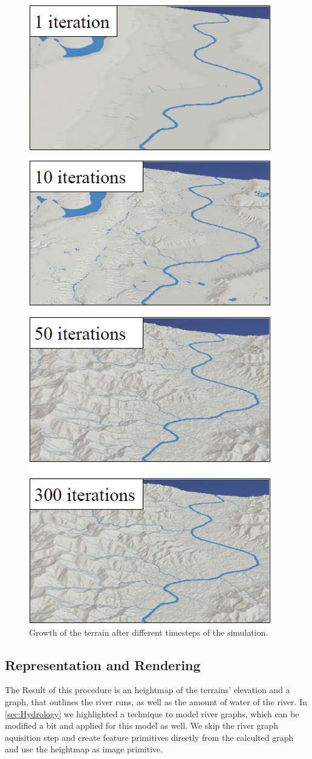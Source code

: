 \begin{figure}[htb]	
	\centering
	\includegraphics[width=0.8\linewidth]{cordonnier2016large/iterations}
	\caption{Growth of the terrain after different timesteps of the simulation.}
	\label{fig:iterations}
\end{figure}

\subsection{Representation and Rendering}
The Result of this procedure is an heightmap of the terrains' elevation and a graph, that outlines the river runs, as well as the amount of water of the river. 
In \ref{sec:Hydrology} we highlighted a technique to model river graphs, which can be modified a bit and applied for this model as well. We skip the river graph aquisition step and create feature primitives directly from the calculted graph and use the heightmap as image primitive.  